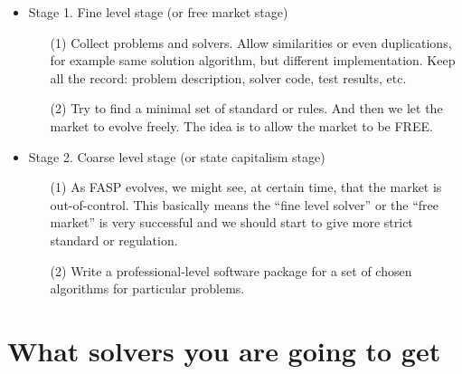 \documentclass[11pt]{memoir}
\begin{document}
\begin{itemize}

\item Stage 1. Fine level stage (or free market stage)

\begin{enumerate}
\item[(1)] Collect problems and solvers. Allow similarities or even duplications, for example same solution algorithm, but different implementation. Keep all the record: problem description, solver code, test results, etc.
%
\item[(2)] Try to find a minimal set of standard or rules. And then we let the market to evolve freely. The idea is to allow the market to be FREE.
\end{enumerate}

\item Stage 2. Coarse level stage (or state capitalism stage)

\begin{enumerate}
\item[(1)] As FASP evolves, we might see, at certain time, that the market is out-of-control. This basically means the ``fine level solver'' or the ``free market'' is very successful and we should start to give more strict standard or regulation.
%
\item[(2)] Write a professional-level software package for a set of chosen algorithms for particular problems.
\end{enumerate}
\end{itemize}

\section{What solvers you are going to get}\label{sec:idea}
\end{document}
